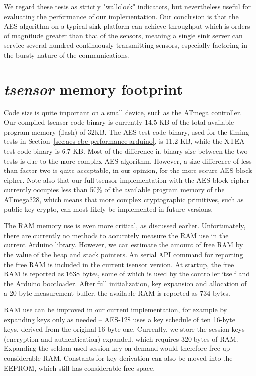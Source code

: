 We regard these tests as strictly "wallclock" indicators, but nevertheless useful for evaluating the performance of our implementation.
%
Our conclusion is that the AES algorithm on a typical sink platform can achieve throughput which is orders of magnitude greater than that of the sensors, meaning a single sink server can service several hundred continuously transmitting sensors, especially factoring in the bursty nature of the communications.

\section{\textit{tsensor} memory footprint}

Code size is quite important on a small device, such as the ATmega controller. Our compiled tsensor code binary is currently 14.5 KB of the total available program memory (flash) of 32KB. The AES test code binary, used for the timing tests in Section~\ref{sec:aes-cbc-performance-arduino}, is 11.2 KB, while the XTEA test code binary is 6.7 KB. Most of the difference in binary size between the two tests is due to the more complex AES algorithm. However, a size difference of less than factor two is quite acceptable, in our opinion, for the more secure AES block cipher. Note also that our full tsensor implementation with the AES block cipher currently occupies less than 50\% of the available program memory of the ATmega328, which means that more complex cryptographic primitives, such as public key crypto, can most likely be implemented in future versions.

The RAM memory use is even more critical, as discussed earlier. Unfortunately, there are currently no methods to accurately measure the RAM use in the current Arduino library. However, we can estimate the amount of free RAM by the value of the heap and stack pointers. An serial API command for reporting the free RAM is included in the current tsensor version. At startup, the free RAM is reported as 1638 bytes, some of which is used by the controller itself and the Arduino bootloader. After full initialization, key expansion and allocation of a 20 byte measurement buffer, the available RAM is reported as 734 bytes. 

RAM use can be improved in our current implementation, for example by expanding keys only as needed -- AES-128 uses a key schedule of ten 16-byte keys, derived from the original 16 byte one. Currently, we store the session keys (encryption and authentication) expanded, which requires 320 bytes of RAM. Expanding the seldom used session key on demand would therefore free up considerable RAM. Constants for key derivation can also be moved into the EEPROM, which still has considerable free space.

